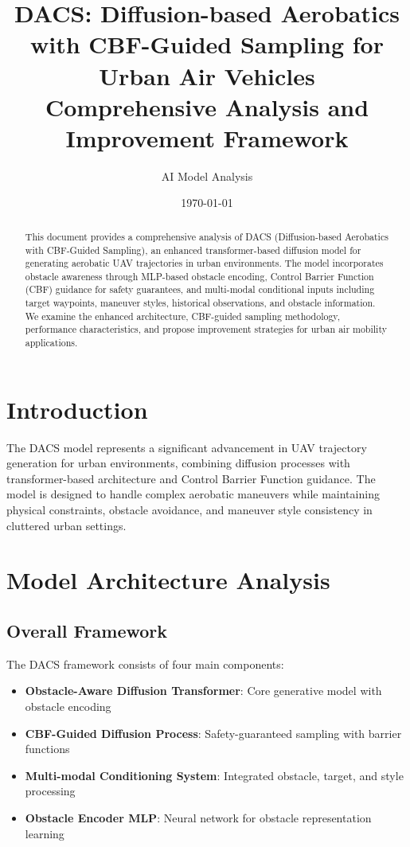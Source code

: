 \documentclass[12pt]{article}
\title{DACS: Diffusion-based Aerobatics with CBF-Guided Sampling for Urban Air Vehicles \\ Comprehensive Analysis and Improvement Framework}
\author{AI Model Analysis}
\date{\today}
\begin{document}
\maketitle

\begin{abstract}
This document provides a comprehensive analysis of DACS (Diffusion-based Aerobatics with CBF-Guided Sampling), an enhanced transformer-based diffusion model for generating aerobatic UAV trajectories in urban environments. The model incorporates obstacle awareness through MLP-based obstacle encoding, Control Barrier Function (CBF) guidance for safety guarantees, and multi-modal conditional inputs including target waypoints, maneuver styles, historical observations, and obstacle information. We examine the enhanced architecture, CBF-guided sampling methodology, performance characteristics, and propose improvement strategies for urban air mobility applications.
\end{abstract}

\tableofcontents

\section{Introduction}

The DACS model represents a significant advancement in UAV trajectory generation for urban environments, combining diffusion processes with transformer-based architecture and Control Barrier Function guidance. The model is designed to handle complex aerobatic maneuvers while maintaining physical constraints, obstacle avoidance, and maneuver style consistency in cluttered urban settings.

\section{Model Architecture Analysis}

\subsection{Overall Framework}

The DACS framework consists of four main components:

\begin{itemize}
    \item \textbf{Obstacle-Aware Diffusion Transformer}: Core generative model with obstacle encoding
    \item \textbf{CBF-Guided Diffusion Process}: Safety-guaranteed sampling with barrier functions
    \item \textbf{Multi-modal Conditioning System}: Integrated obstacle, target, and style processing
    \item \textbf{Obstacle Encoder MLP}: Neural network for obstacle representation learning
\end{itemize}
\end{document}
